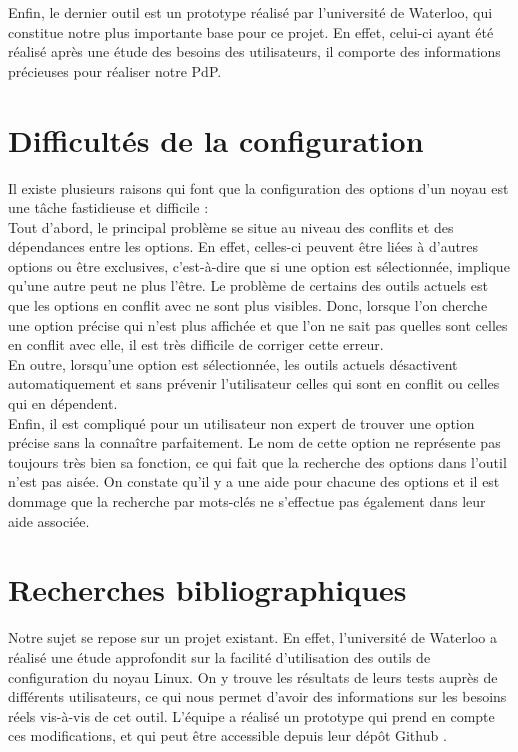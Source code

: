 ﻿\documentclass[17pts]{report}
\begin{document}
Enfin, le dernier outil est un prototype réalisé par l'université de Waterloo,
qui constitue notre plus importante base pour ce projet. En effet, celui-ci
ayant été réalisé après une étude des besoins des utilisateurs, il comporte des
informations précieuses pour réaliser notre PdP.  \\

\pagebreak

\section{Difficultés de la configuration}
\label{sec:Difficultés de la configuration}
Il existe plusieurs raisons qui font que la configuration des options d’un
noyau est une tâche fastidieuse et difficile : \\

Tout d’abord, le principal problème se situe au niveau des conflits et des
dépendances entre les options. En effet, celles-ci peuvent être liées à
d’autres options ou être exclusives, c’est-à-dire que si une option est
sélectionnée, implique qu'une autre peut ne plus l’être.  Le problème de
certains des outils actuels est que les options en conflit avec ne sont plus
visibles. Donc, lorsque l’on cherche une option précise qui n’est plus affichée
et que l’on ne sait pas quelles sont celles en conflit avec elle, il est très
difficile de corriger cette erreur.  \\

En outre, lorsqu'une option est sélectionnée, les outils actuels désactivent
automatiquement et sans prévenir l'utilisateur celles qui sont en conflit ou
celles qui en dépendent.  \\

Enfin, il est compliqué pour un utilisateur non expert de trouver une option
précise sans la connaître parfaitement. Le nom de cette option ne représente
pas toujours très bien sa fonction, ce qui fait que la recherche des options
dans l’outil n’est pas aisée.  On constate qu’il y a une aide pour chacune des
options et il est dommage que la recherche par mots-clés ne s’effectue pas
également dans leur aide associée.

\section{Recherches bibliographiques}
\label{sec:Recherches bibliographiques}
Notre sujet se repose sur un projet existant. En effet, l'université de
Waterloo a réalisé une étude approfondit \cite{Waterloo:Etude} sur la facilité
d'utilisation des outils de configuration du noyau Linux. On y trouve les
résultats de leurs tests auprès de différents utilisateurs, ce qui nous permet
d'avoir des informations sur les besoins réels vis-à-vis de cet outil. L'équipe
a réalisé un prototype qui prend en compte ces modifications, et qui peut
être accessible depuis leur dépôt Github \cite{Waterloo:Github}.  \\
\end{document}
